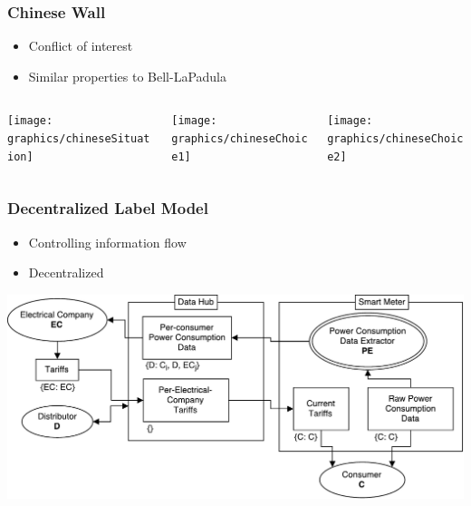 \begin{frame}
  \frametitle{Chinese Wall}

  \begin{itemize}
    \item Conflict of interest
    \item Similar properties to Bell-LaPadula
  \end{itemize}
  \vfill
  \begin{columns}
    \begin{column}{.33\textwidth}
      \texttt{[image: graphics/chineseSituation]}
    \end{column}
    \begin{column}{.33\textwidth}
      \texttt{[image: graphics/chineseChoice1]}
    \end{column}
    \begin{column}{.33\textwidth}
      \texttt{[image: graphics/chineseChoice2]}
    \end{column}
  \end{columns}
\end{frame}

\begin{frame}
  \frametitle{Decentralized Label Model}

  \begin{itemize}
    \item Controlling information flow
    \item Decentralized
  \end{itemize}

  \vfill

  \includegraphics[width=\textwidth]{graphics/dlm_sm_example}
\end{frame}
